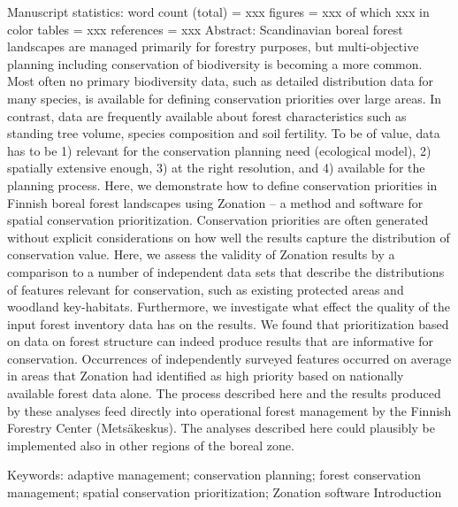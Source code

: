 \documentclass[]{article}
\begin{document}
Manuscript statistics: word count (total) = xxx figures = xxx of which
xxx in color tables = xxx references = xxx Abstract: Scandinavian boreal
forest landscapes are managed primarily for forestry purposes, but
multi-objective planning including conservation of biodiversity is
becoming a more common. Most often no primary biodiversity data, such as
detailed distribution data for many species, is available for defining
conservation priorities over large areas. In contrast, data are
frequently available about forest characteristics such as standing tree
volume, species composition and soil fertility. To be of value, data has
to be 1) relevant for the conservation planning need (ecological model),
2) spatially extensive enough, 3) at the right resolution, and 4)
available for the planning process. Here, we demonstrate how to define
conservation priorities in Finnish boreal forest landscapes using
Zonation -- a method and software for spatial conservation
prioritization. Conservation priorities are often generated without
explicit considerations on how well the results capture the distribution
of conservation value. Here, we assess the validity of Zonation results
by a comparison to a number of independent data sets that describe the
distributions of features relevant for conservation, such as existing
protected areas and woodland key-habitats. Furthermore, we investigate
what effect the quality of the input forest inventory data has on the
results. We found that prioritization based on data on forest structure
can indeed produce results that are informative for conservation.
Occurrences of independently surveyed features occurred on average in
areas that Zonation had identified as high priority based on nationally
available forest data alone. The process described here and the results
produced by these analyses feed directly into operational forest
management by the Finnish Forestry Center (Metsäkeskus). The analyses
described here could plausibly be implemented also in other regions of
the boreal zone.

Keywords: adaptive management; conservation planning; forest
conservation management; spatial conservation prioritization; Zonation
software Introduction
\end{document}
